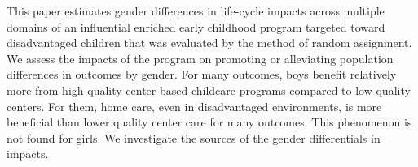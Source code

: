 \noindent This paper estimates gender differences in life-cycle impacts across multiple domains of an influential enriched early childhood program targeted toward disadvantaged children that was evaluated by the method of random assignment. We assess the impacts of the program on promoting or alleviating population differences in outcomes by gender. For many outcomes, boys benefit relatively more from high-quality center-based childcare programs compared to low-quality centers. For them, home care, even in disadvantaged environments, is more beneficial than lower quality center care for many outcomes. This phenomenon is not found for girls. We investigate the sources of the gender differentials in impacts. 